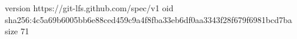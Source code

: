 version https://git-lfs.github.com/spec/v1
oid sha256:4c5a69b6005bb6e88ced459c9a4f8fba33eb6df0aa3343f28f679f6981bcd7ba
size 71
